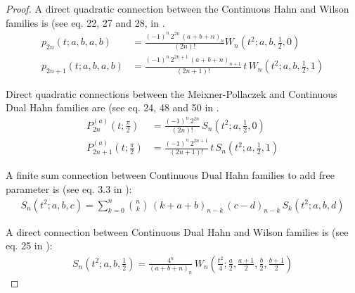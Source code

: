 \documentclass[a4paper,11pt,twoside]{amsart}
\newcommand{\defeq}{=}
\newcommand{\defeq}{\stackrel{\scriptscriptstyle \textnormal{def}}{=}}
\begin{document}
\begin{proof}
A direct quadratic connection between the Continuous Hahn and Wilson families is (see eq. 22, 27 and 28, in \cite{koesup}.
\begin{align}
 p_{2n}(t;a,b,a,b) &\defeq \frac{(-1)^n\,2^{2n}\,(a+b+n)_n}{(2n)!} W_n\left(t^2;a,b,\frac12,0\right) \label{con3} \\
 p_{2n+1}(t;a,b,a,b) &\defeq \frac{(-1)^n\,2^{2n+1}\,(a+b+n)_{n+1}}{(2n+1)!}\,t\, W_n\left(t^2;a,b,\frac12,1\right) \label{con31}
\end{align}

Direct quadratic connections between the Meixner-Pollaczek and Continuous Dual Hahn families are (see eq. 24, 48 and 50 in \cite{koesup}.
\begin{align}
 P_{2n}^{(a)}\left(t;\frac{\pi}{2}\right) &\defeq \frac{(-1)^n\,2^{2n}}{(2n)!}\,S_n\left(t^2;a,\frac12,0\right) \label{con4} \\
 P_{2n+1}^{(a)}\left(t;\frac{\pi}{2}\right) &\defeq \frac{(-1)^n\,2^{2n+1}}{(2n+1)!}\,t\,S_n\left(t^2;a,\frac12,1\right) \label{con41}
\end{align}

A  finite sum connection between Continuous Dual Hahn families to add free parameter is (see eq. 3.3 in \cite{connex}):
\begin{align}
 S_n\left(t^2;a,b,c\right) \defeq \sum_{k=0}^n \binom{n}{k}\,(k+a+b)_{n-k}\,(c-d)_{n-k}\,S_k(t^2;a,b,d) \label{con5}
\end{align}

A direct connection between Continuous Dual Hahn and Wilson families is (see eq. 25 in \cite{koesup}):
\begin{align}
 S_n\left(t^2;a,b,\frac12\right) \defeq \frac{4^n}{(a+b+n)_n}\, W_n\left(\frac{t^2}{4};\frac{a}{2},\frac{a+1}{2},\frac{b}{2},\frac{b+1}{2}\right) \label{con6}
\end{align}



\end{proof}
\end{document}
